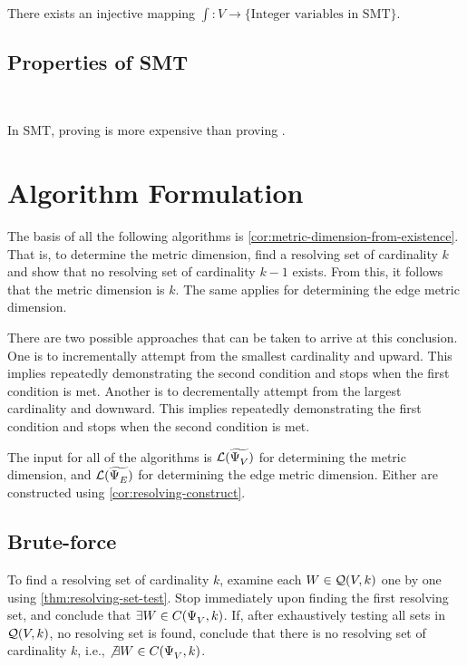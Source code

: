 \begin{definition}
	\ \begin{center}
		There exists an injective mapping \(\int: V \to \{\text{Integer variables in SMT}\}\).
	\end{center}
\end{definition}

\subsection{Properties of SMT}

\begin{conjecture}
	\ \begin{center}
		In SMT, proving \unsat is more expensive than proving \sat.
	\end{center}
\end{conjecture}

\cleardoublepage
\section{Algorithm Formulation}

The basis of all the following algorithms is \autoref{cor:metric-dimension-from-existence}. That is, to determine the metric dimension, find a resolving set of cardinality \(k\) and show that no resolving set of cardinality \(k - 1\) exists. From this, it follows that the metric dimension is \(k\). The same applies for determining the edge metric dimension.

There are two possible approaches that can be taken to arrive at this conclusion. One is to incrementally attempt from the smallest cardinality and upward. This implies repeatedly demonstrating the second condition and stops when the first condition is met. Another is to decrementally attempt from the largest cardinality and downward. This implies repeatedly demonstrating the first condition and stops when the second condition is met.

The input for all of the algorithms is \(\mathcal{L}(\widetilde{\Psi^{}_{V}})\) for determining the metric dimension, and \(\mathcal{L}(\widetilde{\Psi^{}_{E}})\) for determining the edge metric dimension. Either are constructed using \autoref{cor:resolving-construct}.

\subsection{Brute-force}

To find a resolving set of cardinality \(k\), examine each \(W \in \mathcal{Q}(V, k)\) one by one using \autoref{thm:resolving-set-test}. Stop immediately upon finding the first resolving set, and conclude that \(\exists W \in C(\Psi^{}_{V},k)\). If, after exhaustively testing all sets in \(\mathcal{Q}(V, k)\), no resolving set is found, conclude that there is no resolving set of cardinality \(k\), i.e., \(\not\exists W \in C(\Psi^{}_{V},k)\).

